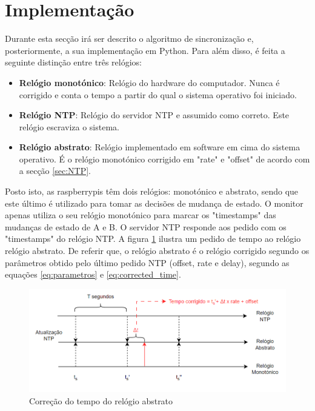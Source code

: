 \section{Implementação} \label{sec:implementação}

    Durante esta secção irá ser descrito o algoritmo de sincronização e, posteriormente, a sua implementação em Python. Para além disso, é feita a seguinte distinção entre três relógios:
    
    \begin{itemize}
        \item \textbf{Relógio monotónico}:  Relógio do hardware do computador. Nunca é corrigido e conta o tempo a partir do qual o sistema operativo foi iniciado.
        \item \textbf{Relógio NTP}: Relógio do servidor NTP e assumido como correto. Este relógio escraviza o sistema.
        \item \textbf{Relógio abstrato}: Relógio implementado em software em cima do sistema operativo. É o relógio monotónico corrigido em "rate" e "offset" de acordo com a secção \ref{sec:NTP}.
    \end{itemize}

    Posto isto, as raspberrypis têm dois relógios: monotónico e abstrato, sendo que este último é utilizado para tomar as decisões de mudança de estado. O monitor apenas utiliza o seu relógio monotónico para marcar os "timestamps" das mudanças de estado de A e B. O servidor NTP responde aos pedido com os "timestamps" do relógio NTP. A figura \ref{fig:tempo_corrigido} ilustra um pedido de tempo ao relógio relógio abstrato. De referir que, o relógio abstrato é o relógio corrigido segundo os parâmetros obtido pelo último pedido NTP (offset, rate e delay), segundo as equações \ref{eq:parametros} e \ref{eq:corrected_time}.

    \begin{figure}[h]
        \centering
        \includegraphics[width=1.0\linewidth]{figures/tempo_corrigido.png}
        \caption{Correção do tempo do relógio abstrato}
        \label{fig:tempo_corrigido}
    \end{figure}

